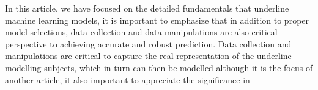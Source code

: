 
\par
In this article, we have focused on the detailed fundamentals that underline machine learning models, it is important to emphasize that in addition to proper model selections, data collection and data manipulations are also critical perspective to achieving accurate and robust prediction. Data collection and manipulations are critical to capture the real representation of the underline modelling subjects, which in turn can then be modelled  although it is the focus of another article, it also important to appreciate the significance in 
\par 
